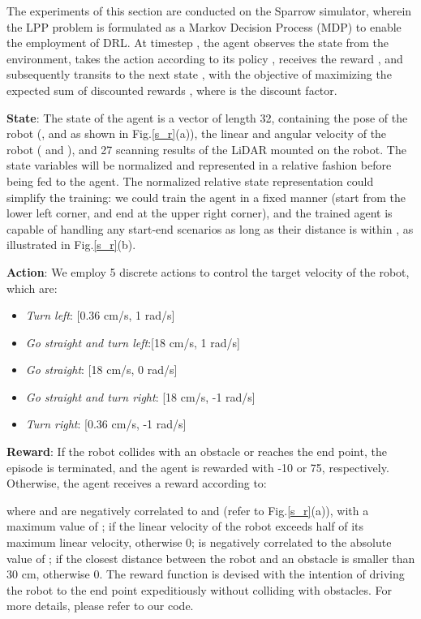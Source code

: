 \documentclass[journal]{IEEEtran}
\begin{document}
The experiments of this section are conducted on the Sparrow simulator, wherein the LPP problem is formulated as a Markov Decision Process (MDP) to enable the employment of DRL. At timestep , the agent observes the state  from the environment, takes the action  according to its policy , receives the reward , and subsequently transits to the next state , with the objective of maximizing the expected sum of discounted rewards , where  is the discount factor.

\noindent \textbf{State}: The state of the agent is a vector of length 32, containing the pose of the robot (,  and  as shown in Fig.\ref{s_r}(a)), the linear and angular velocity of the robot ( and ), and 27 scanning results of the LiDAR mounted on the robot. The state variables will be normalized and represented in a relative fashion before being fed to the agent. The normalized relative state representation could simplify the training: we could train the agent in a fixed manner (start from the lower left corner, and end at the upper right corner), and the trained agent is capable of handling any start-end scenarios as long as their distance is within , as illustrated in Fig.\ref{s_r}(b).

\noindent \textbf{Action}: We employ 5 discrete actions to control the target velocity  of the robot, which are:

\begin{itemize}
	\item{\textit{Turn left}: [0.36 cm/s, 1 rad/s]}
	\item{\textit{Go straight and turn left}:[18 cm/s, 1 rad/s]}
	\item{\textit{Go straight}: [18 cm/s, 0 rad/s]}
	\item{\textit{Go straight and turn right}: [18 cm/s, -1 rad/s]}
	\item{\textit{Turn right}: [0.36 cm/s, -1 rad/s]}
\end{itemize}

\noindent \textbf{Reward}: If the robot collides with an obstacle or reaches the end point, the episode is terminated, and the agent is rewarded with -10 or 75, respectively. Otherwise, the agent receives a reward according to:

\noindent where  and   are negatively correlated to  and  (refer to Fig.\ref{s_r}(a)), with a maximum value of ;  if the linear velocity of the robot exceeds half of its maximum linear velocity, otherwise 0;  is negatively correlated to the absolute value of ;  if the closest distance between the robot and an obstacle is smaller than 30 cm, otherwise 0. The reward function is devised with the intention of driving the robot to the end point expeditiously without colliding with obstacles. For more details, please refer to our code\footnotemark[1].
\end{document}
